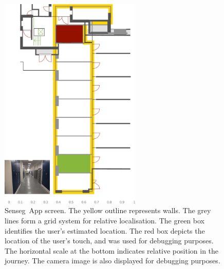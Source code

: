 \begin{figure}[h]
\centering
\includegraphics[width = 0.6\textwidth]{./gfx/Chapter06/screen.pdf}
\caption{Senseg\texttrademark\ App screen. The yellow outline represents walls. The grey lines form a grid system for relative localisation. The green box identifies the user's estimated location. The red box depicts the location of the user's touch, and was used for debugging purposes. The horizontal scale at the bottom indicates relative position in the journey. The camera image is also displayed for debugging purposes.}
\label{fig:sensegscreen}
\end{figure}


